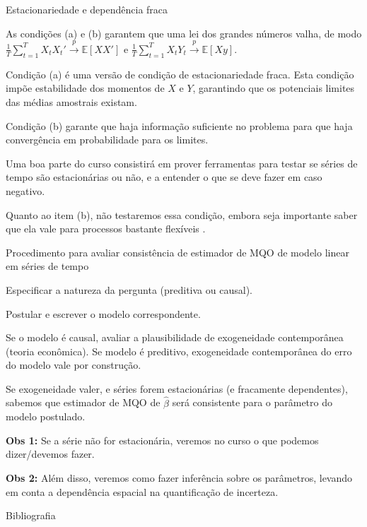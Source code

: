 \documentclass[11pt]{beamer}
\newenvironment{halfwideitemize}{\itemize\addtolength{\itemsep}{0.5em}}{\enditemize}
\newenvironment{halfwideenumerate}{\enumerate\addtolength{\itemsep}{0.5em}}{\endenumerate}
\begin{document}
	\begin{frame}{Estacionariedade e dependência fraca}
		\begin{halfwideitemize}
			\item As condições (a) e (b) garantem que uma lei dos grandes números valha, de modo $\frac{1}{T}\sum_{t=1}^T X_t X_t' \overset{p}{\to} \mathbb{E}[XX']$ e $\frac{1}{T}\sum_{t=1}^T X_t Y_t \overset{p}{\to} \mathbb{E}[X y]$.
			\begin{halfwideitemize}
				\item Condição (a) é uma versão de condição de {\color{blue}estacionariedade fraca}. Esta condição impõe estabilidade dos momentos de $X$ e $Y$, garantindo que os potenciais limites das médias amostrais existam.
				\item Condição (b) garante que haja informação suficiente no problema para que haja convergência em probabilidade para os limites.
			\end{halfwideitemize}
			\item Uma boa parte do curso consistirá em prover ferramentas para testar se séries de tempo são estacionárias ou não, e a entender o que se deve fazer em caso negativo. 
			\item Quanto ao item (b), não testaremos essa condição, embora seja importante saber que ela vale para processos bastante flexíveis \citep{Carrasco2002}.
		\end{halfwideitemize}
	\end{frame}
	
	\begin{frame}{Procedimento para avaliar consistência de estimador de MQO de modelo linear em séries de tempo}
		\begin{halfwideenumerate}
			\item Especificar a natureza da pergunta (preditiva ou causal). 
			\item Postular e escrever o modelo correspondente.
			\item Se o modelo é causal, avaliar a plausibilidade de exogeneidade contemporânea (teoria econômica). Se modelo é preditivo, exogeneidade contemporânea do erro do modelo vale por construção.
			\item Se exogeneidade valer, e séries forem estacionárias (e fracamente dependentes), sabemos que estimador de MQO de $\hat{\beta}$ será consistente para o parâmetro do modelo postulado.

		\end{halfwideenumerate}
		\vspace{1em}
			\textbf{Obs 1:} Se a série não for estacionária, veremos no curso o que podemos dizer/devemos fazer.
			
			\vspace{1em}
			\textbf{Obs 2:} Além disso, veremos como fazer inferência sobre os parâmetros, levando em conta a dependência espacial na quantificação de incerteza.
		\end{frame}
	\begin{frame}[allowframebreaks]{Bibliografia}
	\printbibliography
	\end{frame}
\end{document}
